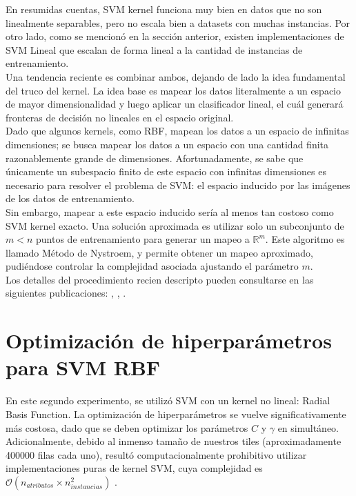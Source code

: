 En resumidas cuentas, SVM kernel funciona muy bien en datos que no son linealmente separables, pero no escala bien a datasets con muchas instancias. Por otro lado, como se mencionó en la sección anterior, existen implementaciones de SVM Lineal que escalan de forma lineal a la cantidad de instancias de entrenamiento. \\

Una tendencia reciente es combinar ambos, dejando de lado la idea fundamental del truco del kernel. La idea base es mapear los datos literalmente a un espacio de mayor dimensionalidad y luego aplicar un clasificador lineal, el cuál generará fronteras de decisión no lineales en el espacio original. \\

Dado que algunos kernels, como RBF, mapean los datos a un espacio de infinitas dimensiones; se busca mapear los datos a un espacio con una cantidad finita razonablemente grande de dimensiones. Afortunadamente, se sabe que únicamente un subespacio finito de este espacio con infinitas dimensiones es necesario para resolver el problema de SVM: el espacio inducido por las imágenes de los datos de entrenamiento. \\

Sin embargo, mapear a este espacio inducido sería al menos tan costoso como SVM kernel exacto. Una solución aproximada es utilizar solo un subconjunto de $m<n$ puntos de entrenamiento para generar un mapeo a $\mathbb{R}^m$. Este algoritmo es llamado Método de Nystroem, y permite obtener un mapeo aproximado, pudiéndose controlar la complejidad asociada ajustando el parámetro $m$. \\

Los detalles del procedimiento recien descripto pueden consultarse en las siguientes publicaciones: \cite{nystroem}, \cite{NIPS2012_621bf66d}, \cite{NIPS2007_013a006f}.

\section{Optimización de hiperparámetros para SVM RBF}

En este segundo experimento, se utilizó SVM con un kernel no lineal: Radial Basis Function. La optimización de hiperparámetros se vuelve significativamente más costosa, dado que se deben optimizar los parámetros $C$ y $\gamma$ en simultáneo. Adicionalmente, debido al inmenso tamaño de nuestros tiles (aproximadamente 400000 filas cada uno), resultó computacionalmente prohibitivo utilizar implementaciones puras de kernel SVM, cuya complejidad es $\mathcal{O}(n_{atributos} \times n_{instancias}^2)$ \cite{libsvm}. \\

